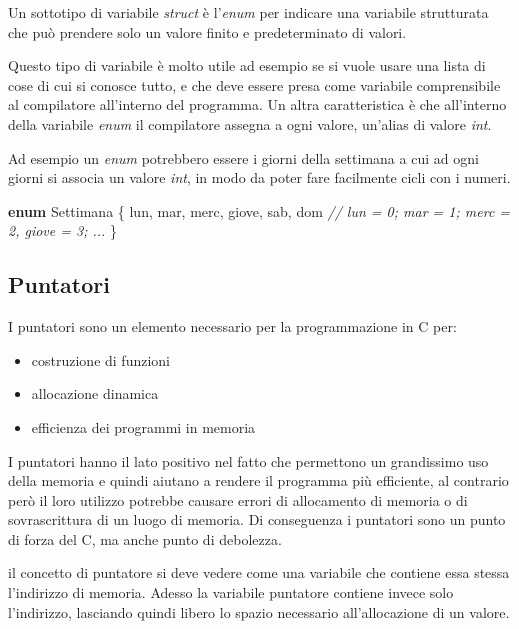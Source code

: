 \documentclass[
]{article}
\newenvironment{Shaded}{}{}
\newcommand{\CommentTok}[1]{\textcolor[rgb]{0.38,0.63,0.69}{\textit{#1}}}
\newcommand{\KeywordTok}[1]{\textcolor[rgb]{0.00,0.44,0.13}{\textbf{#1}}}
\newcommand{\NormalTok}[1]{#1}
\begin{document}
Un sottotipo di variabile \emph{struct} è l'\emph{enum} per indicare una
variabile strutturata che può prendere solo un valore finito e
predeterminato di valori.

Questo tipo di variabile è molto utile ad esempio se si vuole usare una
lista di cose di cui si conosce tutto, e che deve essere presa come
variabile comprensibile al compilatore all'interno del programma. Un
altra caratteristica è che all'interno della variabile \emph{enum} il
compilatore assegna a ogni valore, un'alias di valore \emph{int}.

Ad esempio un \emph{enum} potrebbero essere i giorni della settimana a
cui ad ogni giorni si associa un valore \emph{int}, in modo da poter
fare facilmente cicli con i numeri.

\begin{Shaded}
\begin{Highlighting}[]
\KeywordTok{enum}\NormalTok{ Settimana \{}
\NormalTok{	lun, mar, merc, giove, sab, dom}
        \CommentTok{// lun = 0; mar = 1; merc = 2, giove = 3; ...}
\NormalTok{\}}
\end{Highlighting}
\end{Shaded}

\hypertarget{header-n643}{%
\subsection{Puntatori}\label{header-n643}}

I puntatori sono un elemento necessario per la programmazione in C per:

\begin{itemize}
\item
  costruzione di funzioni
\end{itemize}

\begin{itemize}
\item
  allocazione dinamica
\item
  efficienza dei programmi in memoria
\end{itemize}

I puntatori hanno il lato positivo nel fatto che permettono un
grandissimo uso della memoria e quindi aiutano a rendere il programma
più efficiente, al contrario però il loro utilizzo potrebbe causare
errori di allocamento di memoria o di sovrascrittura di un luogo di
memoria. Di conseguenza i puntatori sono un punto di forza del C, ma
anche punto di debolezza.

il concetto di puntatore si deve vedere come una variabile che contiene
essa stessa l'indirizzo di memoria. Adesso la variabile puntatore
contiene invece solo l'indirizzo, lasciando quindi libero lo spazio
necessario all'allocazione di un valore.
\end{document}
